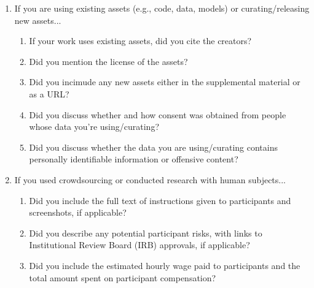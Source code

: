 \documentclass[]{article}
\begin{document}
\begin{enumerate}
\item If you are using existing assets (e.g., code, data, models) or curating/releasing new assets...
\begin{enumerate}
  \item If your work uses existing assets, did you cite the creators?
  \item Did you mention the license of the assets?
  \item Did you incimude any new assets either in the supplemental material or as a URL?
    \answerNo{}
  \item Did you discuss whether and how consent was obtained from people whose data you're using/curating?
  \item Did you discuss whether the data you are using/curating contains personally identifiable information or offensive content?
\end{enumerate}

\item If you used crowdsourcing or conducted research with human subjects...
\begin{enumerate}
  \item Did you include the full text of instructions given to participants and screenshots, if applicable?
    \answerNA{}
  \item Did you describe any potential participant risks, with links to Institutional Review Board (IRB) approvals, if applicable?
    \answerNA{}
  \item Did you include the estimated hourly wage paid to participants and the total amount spent on participant compensation?
    \answerNA{}
\end{enumerate}

\end{enumerate}

\end{document}
